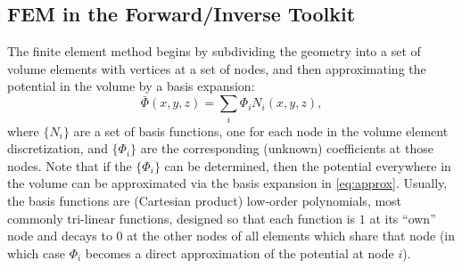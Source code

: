 \subsection{FEM in the Forward/Inverse Toolkit}




The finite element method begins by subdividing the geometry into a set of
volume elements with vertices at a set of nodes, and then approximating
the potential in the volume by a basis expansion:
\begin{equation} \bar{\Phi}(x,y,z) = \sum_i \Phi_i
N_i(x,y,z), \label{eq:approx}
\end{equation}
\noindent where $\{N_i\}$ are a set of basis functions, one for each node in the
volume element discretization, and
$\{\Phi_i\}$ are the corresponding (unknown) coefficients at those nodes.
Note that if the
$\{\Phi_i\}$ can be determined, then the potential everywhere in the volume
can be approximated via the basis expansion in
\autoref{eq:approx}. Usually, the basis functions are (Cartesian product)
low-order polynomials, most commonly tri-linear functions, designed so that
each function is $1$ at its ``own'' node and decays to $0$ at the other nodes of
all elements which share that node (in which case $\Phi_{i}$ becomes a
direct approximation of the potential at node $i$).


